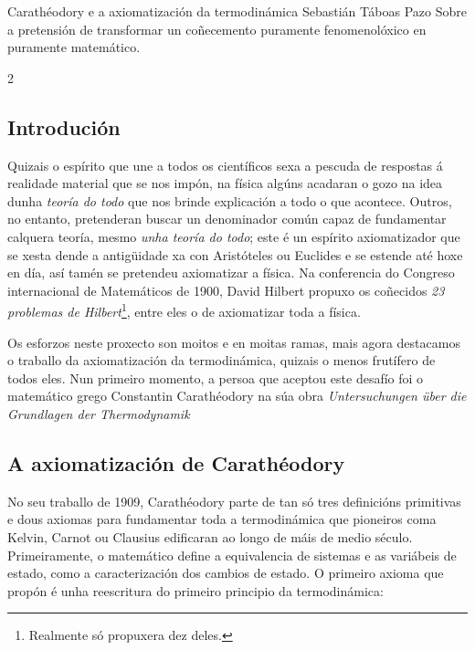 \Titular*%
{divulgacion}
{Carathéodory e a axiomatización da termodinámica}
{Sebastián Táboas Pazo}
{Sobre a pretensión de transformar un coñecemento puramente fenomenolóxico en puramente matemático.}


\begin{refsection}
\begin{multicols}{2}

\subsection*{Introdución}

Quizais o espírito que une a todos os científicos sexa a pescuda de respostas á
realidade material que se nos impón, na física algúns acadaran o gozo na idea
dunha \textit{teoría do todo} que nos brinde explicación a todo o que acontece.
Outros, no entanto, pretenderan buscar un denominador común capaz de
fundamentar calquera teoría, mesmo \textit{unha teoría do todo}; este é un
espírito axiomatizador que se xesta dende a antigüidade xa con Aristóteles ou
Euclides e se estende até hoxe en día, así tamén se pretendeu axiomatizar a
física. Na conferencia do Congreso internacional de Matemáticos de 1900, David
Hilbert propuxo os coñecidos \textit{23 problemas de
Hilbert}\footnote{Realmente só propuxera dez deles.}, entre eles o de
axiomatizar toda a física.

Os esforzos neste proxecto son moitos e en moitas ramas, mais agora destacamos
o traballo da axiomatización da termodinámica, quizais o menos frutífero de
todos eles. Nun primeiro momento, a persoa que aceptou este desafío foi o
matemático grego Constantin Carathéodory na súa obra \textit{Untersuchungen
über die Grundlagen der Thermodynamik}

\subsection*{A axiomatización de Carathéodory}

No seu traballo de 1909, Carathéodory parte de tan só tres definicións
primitivas e dous axiomas para fundamentar toda a termodinámica que pioneiros
coma Kelvin, Carnot ou Clausius edificaran ao longo de máis de medio século.
Primeiramente, o matemático define a equivalencia de sistemas e as variábeis de
estado, como a caracterización dos cambios de estado. O primeiro axioma que
propón é unha reescritura do primeiro principio da termodinámica:


\end{multicols}
\end{refsection}
